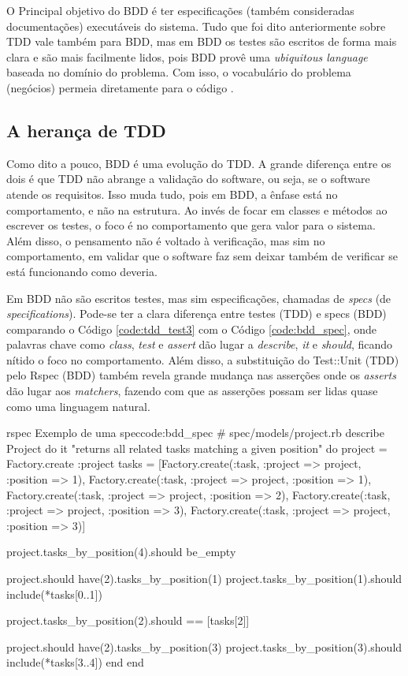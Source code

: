 O Principal objetivo do BDD é ter especificações (também consideradas documentações) executáveis do sistema. Tudo que foi dito anteriormente sobre TDD vale também para BDD, mas em BDD os testes são escritos de forma mais clara e são mais facilmente lidos, pois BDD provê uma \textit{ubiquitous language} baseada no domínio do problema. Com isso, o vocabulário do problema (negócios) permeia diretamente para o código \cite{IntroducingBDD}.

\subsection{A herança de TDD}
\label{sub:a_heranca_de_tdd}

Como dito a pouco, BDD é uma evolução do TDD. A grande diferença entre os dois é que TDD não abrange a validação do software, ou seja, se o software atende os requisitos. Isso muda tudo, pois em BDD, a ênfase está no comportamento, e não na estrutura. Ao invés de focar em classes e métodos ao escrever os testes, o foco é no comportamento que gera valor para o sistema. Além disso, o pensamento não é voltado à verificação, mas sim no comportamento, em validar que o software faz sem deixar também de verificar se está funcionando como deveria.

Em BDD não são escritos testes, mas sim especificações, chamadas de \textit{specs} (de \textit{specifications}). Pode-se ter a clara diferença entre testes (TDD) e specs (BDD) comparando o Código \ref{code:tdd_test3} com o Código \ref{code:bdd_spec}, onde palavras chave como \textit{class}, \textit{test} e \textit{assert} dão lugar a \textit{describe}, \textit{it} e \textit{should}, ficando nítido o foco no comportamento. Além disso, a substituição do Test::Unit (TDD) pelo Rspec (BDD) também revela grande mudança nas asserções onde os \textit{asserts} dão lugar aos \textit{matchers}, fazendo com que as asserções possam ser lidas quase como uma linguagem natural.

\begin{mycode}{rspec}%
{Exemplo de uma spec}{code:bdd_spec}
# spec/models/project.rb
describe Project do
  it "returns all related tasks matching a given position" do
    project = Factory.create :project
    tasks = [Factory.create(:task, :project => project, :position => 1),
             Factory.create(:task, :project => project, :position => 1),
             Factory.create(:task, :project => project, :position => 2),
             Factory.create(:task, :project => project, :position => 3),
             Factory.create(:task, :project => project, :position => 3)]

    project.tasks_by_position(4).should be_empty

    project.should have(2).tasks_by_position(1)
    project.tasks_by_position(1).should include(*tasks[0..1])

    project.tasks_by_position(2).should == [tasks[2]]

    project.should have(2).tasks_by_position(3)
    project.tasks_by_position(3).should include(*tasks[3..4])
  end
end
\end{mycode}

